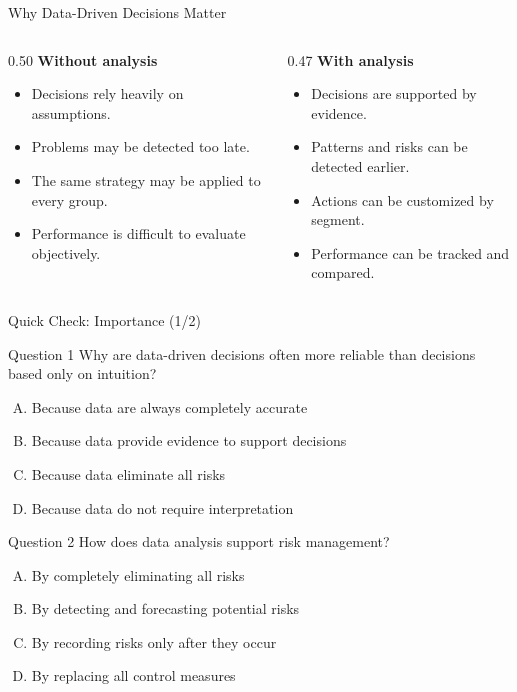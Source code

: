 \documentclass[aspectratio=169,11pt]{beamer}
\begin{document}
\begin{frame}{Why Data-Driven Decisions Matter}
\begin{columns}[T]
\begin{column}{0.50\linewidth}
\textbf{Without analysis}
\begin{itemize}
  \item Decisions rely heavily on assumptions.
  \item Problems may be detected too late.
  \item The same strategy may be applied to every group.
  \item Performance is difficult to evaluate objectively.
\end{itemize}
\end{column}
\begin{column}{0.47\linewidth}
\textbf{With analysis}
\begin{itemize}
  \item Decisions are supported by evidence.
  \item Patterns and risks can be detected earlier.
  \item Actions can be customized by segment.
  \item Performance can be tracked and compared.
\end{itemize}
\end{column}
\end{columns}
\end{frame}

\begin{frame}{Quick Check: Importance (1/2)}
\begin{alertblock}{Question 1}
Why are data-driven decisions often more reliable than decisions based only on intuition?
\end{alertblock}
\begin{enumerate}[A.]
  \item Because data are always completely accurate
  \item Because data provide evidence to support decisions
  \item Because data eliminate all risks
  \item Because data do not require interpretation
\end{enumerate}
\begin{alertblock}{Question 2}
How does data analysis support risk management?
\end{alertblock}
\begin{enumerate}[A.]
  \item By completely eliminating all risks
  \item By detecting and forecasting potential risks
  \item By recording risks only after they occur
  \item By replacing all control measures
\end{enumerate}
\end{frame}
\end{document}
